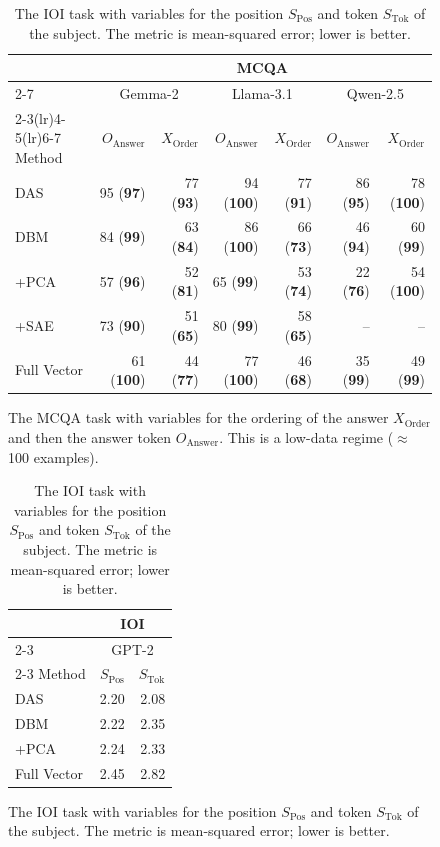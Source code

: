 \documentclass{article}
\theoremstyle{plain}
\theoremstyle{definition}
\theoremstyle{remark}
\newcommand{\order}{X_{\text{Order}}}
\newcommand{\token}{S_{\text{Tok}}}
\newcommand{\position}{S_{\text{Pos}}}
\newcommand{\answer}{O_{\text{Answer}}}
\begin{document}
\begin{table}[t]
\begin{subfigure}[b]{0.6\textwidth}
\centering
  \centering
  \begin{tabular}{lrrrrrr}
    \toprule
     & \multicolumn{6}{c}{MCQA} \\
    \cmidrule(lr){2-7}
 & \multicolumn{2}{c}{Gemma-2} & \multicolumn{2}{c}{Llama-3.1} & \multicolumn{2}{c}{Qwen-2.5} \\
    \cmidrule(lr){2-3}\cmidrule(lr){4-5}\cmidrule(lr){6-7}
    Method & $\answer$ & $\order$ & $\answer$ & $\order$ & $\answer$ & $\order$ \\
    \midrule
    DAS & 95 (\textbf{97}) & 77 (\textbf{93}) & 94 (\textbf{100}) & 77 (\textbf{91}) & 86 (\textbf{95}) & 78 (\textbf{100}) \\
    DBM & 84 (\textbf{99}) & 63 (\textbf{84}) & 86 (\textbf{100}) & 66 (\textbf{73}) & 46 (\textbf{94}) & 60 (\textbf{99}) \\
    +PCA & 57 (\textbf{96}) & 52 (\textbf{81}) & 65 (\textbf{99}) & 53 (\textbf{74}) & 22 (\textbf{76}) & 54 (\textbf{100}) \\
    +SAE & 73 (\textbf{90}) & 51 (\textbf{65}) & 80 (\textbf{99}) & 58 (\textbf{65}) & -- & -- \\
    Full Vector & 61 (\textbf{100}) & 44 (\textbf{77}) & 77 (\textbf{100}) & 46 (\textbf{68}) & 35 (\textbf{99}) & 49 (\textbf{99}) \\
    \bottomrule
  \end{tabular}
  \caption{The MCQA task with variables for the ordering of the answer $\order$ and then the answer token $\answer$. This is a low-data regime ($\approx$100 examples).}
  \label{tab:results-mcqa}
\end{subfigure}
\hfill
\begin{subfigure}[b]{0.33\textwidth}
\centering
  \centering
  \begin{tabular}{lrr}
    \toprule
     & \multicolumn{2}{c}{IOI } \\
    \cmidrule(lr){2-3}
     & \multicolumn{2}{c}{GPT-2} \\
    \cmidrule(lr){2-3}
    Method & $\position$ & $\token$ \\
    \midrule
    DAS & 2.20 & 2.08 \\
    DBM & 2.22 & 2.35 \\
    +PCA & 2.24 & 2.33 \\
    Full Vector  & 2.45 & 2.82 \\
    \bottomrule
  \end{tabular}
  \caption{The IOI task with variables for the position $\position$ and token $\token$ of the subject. The metric is mean-squared error; lower is better. }
  \label{tab:results-ioi}
\end{subfigure}


\end{table}
\end{document}
